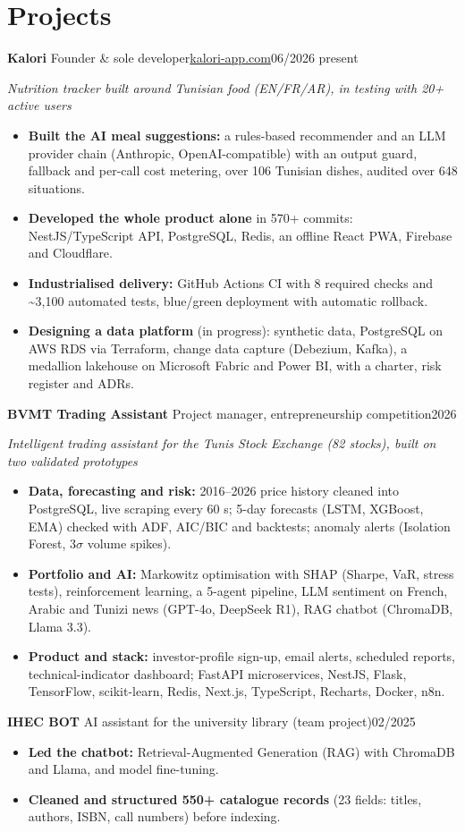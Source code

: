 \documentclass[10pt]{article}
\newcommand{\entry}[3]{\par\vspace{2pt}\textbf{#1}#2\hfill{\color{soft}#3}\par}
\newcommand{\sub}[1]{{\itshape\color{soft}#1\par}}
\newcommand{\sep}{\enspace\textperiodcentered\enspace}
\begin{document}
\section{Projects}
\entry{Kalori}{ \textendash{} Founder \& sole developer\sep \href{https://kalori-app.com}{kalori-app.com}}{06/2026 \textendash{} present}
\sub{Nutrition tracker built around Tunisian food (EN/FR/AR), in testing with 20+ active users}
\begin{itemize}
\item \textbf{Built the AI meal suggestions:} a rules-based recommender and an LLM provider chain (Anthropic, OpenAI-compatible) with an output guard, fallback and per-call cost metering, over 106 Tunisian dishes, audited over 648 situations.
\item \textbf{Developed the whole product alone} in 570+ commits: NestJS/TypeScript API, PostgreSQL, Redis, an offline React PWA, Firebase and Cloudflare.
\item \textbf{Industrialised delivery:} GitHub Actions CI with 8 required checks and \textasciitilde{}3,100 automated tests, blue/green deployment with automatic rollback.
\item \textbf{Designing a data platform} (in progress): synthetic data, PostgreSQL on AWS RDS via Terraform, change data capture (Debezium, Kafka), a medallion lakehouse on Microsoft Fabric and Power BI, with a charter, risk register and ADRs.
\end{itemize}
\entry{BVMT Trading Assistant}{ \textendash{} Project manager, entrepreneurship competition}{2026}
\sub{Intelligent trading assistant for the Tunis Stock Exchange (82 stocks), built on two validated prototypes}
\begin{itemize}
\item \textbf{Data, forecasting and risk:} 2016--2026 price history cleaned into PostgreSQL, live scraping every 60 s; 5-day forecasts (LSTM, XGBoost, EMA) checked with ADF, AIC/BIC and backtests; anomaly alerts (Isolation Forest, 3$\sigma$ volume spikes).
\item \textbf{Portfolio and AI:} Markowitz optimisation with SHAP (Sharpe, VaR, stress tests), reinforcement learning, a 5-agent pipeline, LLM sentiment on French, Arabic and Tunizi news (GPT-4o, DeepSeek R1), RAG chatbot (ChromaDB, Llama 3.3).
\item \textbf{Product and stack:} investor-profile sign-up, email alerts, scheduled reports, technical-indicator dashboard; FastAPI microservices, NestJS, Flask, TensorFlow, scikit-learn, Redis, Next.js, TypeScript, Recharts, Docker, n8n.
\end{itemize}
\entry{IHEC BOT}{ \textendash{} AI assistant for the university library (team project)}{02/2025}
\begin{itemize}
\item \textbf{Led the chatbot:} Retrieval-Augmented Generation (RAG) with ChromaDB and Llama, and model fine-tuning.
\item \textbf{Cleaned and structured 550+ catalogue records} (23 fields: titles, authors, ISBN, call numbers) before indexing.
\end{itemize}
\end{document}
